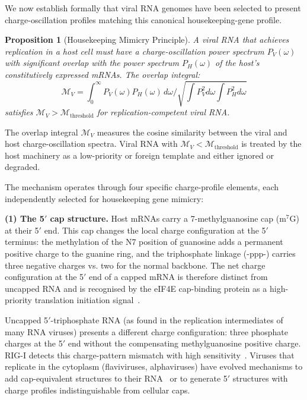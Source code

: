 \documentclass[11pt,twocolumn,a4paper]{article}
\newtheorem{proposition}[theorem]{Proposition}
\theoremstyle{definition}
\theoremstyle{remark}
\begin{document}
We now establish formally that viral RNA genomes have been selected to present charge-oscillation profiles matching this canonical housekeeping-gene profile.

\begin{proposition}[Housekeeping Mimicry Principle]
\label{prop:mimicry}
A viral RNA that achieves replication in a host cell must have a charge-oscillation power spectrum $P_V(\omega)$ with significant overlap with the power spectrum $P_H(\omega)$ of the host's constitutively expressed mRNAs. The overlap integral:
\begin{equation}
  \mathcal{M}_V = \int_0^\infty P_V(\omega) P_H(\omega)\,d\omega \bigg/ \sqrt{\int P_V^2 d\omega \int P_H^2 d\omega}
  \label{eq:overlap}
\end{equation}
satisfies $\mathcal{M}_V > \mathcal{M}_{\mathrm{threshold}}$ for replication-competent viral RNA.
\end{proposition}

The overlap integral $\mathcal{M}_V$ measures the cosine similarity between the viral and host charge-oscillation spectra. Viral RNA with $\mathcal{M}_V < \mathcal{M}_{\mathrm{threshold}}$ is treated by the host machinery as a low-priority or foreign template and either ignored or degraded.

The mechanism operates through four specific charge-profile elements, each independently selected for housekeeping gene mimicry:

\textbf{(1) The 5$'$ cap structure.}
Host mRNAs carry a 7-methylguanosine cap (m$^7$G) at their 5$'$ end. This cap changes the local charge configuration at the 5$'$ terminus: the methylation of the N7 position of guanosine adds a permanent positive charge to the guanine ring, and the triphosphate linkage (-ppp-) carries three negative charges vs. two for the normal backbone. The net charge configuration at the 5$'$ end of a capped mRNA is therefore distinct from uncapped RNA and is recognised by the eIF4E cap-binding protein as a high-priority translation initiation signal~\cite{Sonenberg2009}.

Uncapped 5$'$-triphosphate RNA (as found in the replication intermediates of many RNA viruses) presents a different charge configuration: three phosphate charges at the 5$'$ end without the compensating methylguanosine positive charge. RIG-I detects this charge-pattern mismatch with high sensitivity~\cite{Hornung2006,Pichlmair2006}. Viruses that replicate in the cytoplasm (flaviviruses, alphaviruses) have evolved mechanisms to add cap-equivalent structures to their RNA~\cite{Dong2012} or to generate 5$'$ structures with charge profiles indistinguishable from cellular caps.
\end{document}
